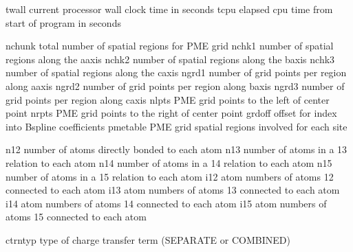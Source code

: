 \documentclass[letterpaper,11pt,english]{sphinxmanual}
\begin{document}

\begin{sphinxVerbatim}[commandchars=\\\{\}]
twall           current processor wall clock time in seconds
tcpu            elapsed cpu time from start of program in seconds
\end{sphinxVerbatim}


\begin{sphinxVerbatim}[commandchars=\\\{\}]
nchunk          total number of spatial regions for PME grid
nchk1           number of spatial regions along the a\PYGZhy{}axis
nchk2           number of spatial regions along the b\PYGZhy{}axis
nchk3           number of spatial regions along the c\PYGZhy{}axis
ngrd1           number of grid points per region along a\PYGZhy{}axis
ngrd2           number of grid points per region along b\PYGZhy{}axis
ngrd3           number of grid points per region along c\PYGZhy{}axis
nlpts           PME grid points to the left of center point
nrpts           PME grid points to the right of center point
grdoff          offset for index into B\PYGZhy{}spline coefficients
pmetable        PME grid spatial regions involved for each site
\end{sphinxVerbatim}


\begin{sphinxVerbatim}[commandchars=\\\{\}]
n12             number of atoms directly bonded to each atom
n13             number of atoms in a 1\PYGZhy{}3 relation to each atom
n14             number of atoms in a 1\PYGZhy{}4 relation to each atom
n15             number of atoms in a 1\PYGZhy{}5 relation to each atom
i12             atom numbers of atoms 1\PYGZhy{}2 connected to each atom
i13             atom numbers of atoms 1\PYGZhy{}3 connected to each atom
i14             atom numbers of atoms 1\PYGZhy{}4 connected to each atom
i15             atom numbers of atoms 1\PYGZhy{}5 connected to each atom
\end{sphinxVerbatim}


\begin{sphinxVerbatim}[commandchars=\\\{\}]
ctrntyp         type of charge transfer term (SEPARATE or COMBINED)
\end{sphinxVerbatim}
\end{document}
